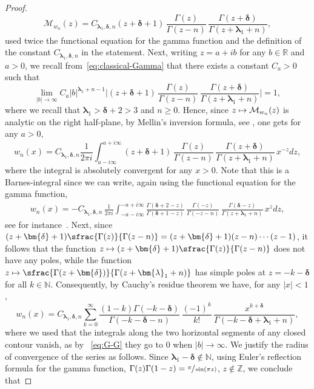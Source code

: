 \documentclass[JEP,XML,SOM,Unicode]{cedram}
\newcommand\mto{\mathchoice{\longmapsto}{\mapsto}{\mapsto}{\mapsto}}
\theoremstyle{plain}
\theoremstyle{definition}
\newcommand{\N}{\mathbb{N}}
\newcommand{\R}{\mathbb{R}}
\newcommand{\lam}{{\bm{\lambda}_1}}
\newcommand{\mm}{{\bm{\delta}}}
\begin{document}
\begin{proof}
\begin{equation*}
\mathcal{M}_{w_n}(z) = C_{\lam, \mm, n} (z+\mm+1)\,\frac{\Gamma(z)}{\Gamma(z-n)}\, \frac{\Gamma(z+\mm)}{\Gamma(z+\lam+n)},
\end{equation*}
used twice the functional equation for the gamma function and the definition of the constant $C_{\lam, \mm, n}$ in the statement. Next, writing $z=a+ib$ for any $b \in \R$ and $a>0$, we recall from~\eqref{eq:classical-Gamma} that there exists a constant $C_a > 0$ such that
\begin{equation}
\label{eq:G-G}
\lim_{|b| \to \infty} C_a |b|^{\lam + n-1} \biggl|(z+\mm+1)\, \frac{\Gamma(z)}{\Gamma(z-n)}\, \frac{\Gamma(z+\mm)}{\Gamma(z+\lam+n)} \biggl| = 1,
\end{equation}
where we recall that $\lam > \mm+2 >3$ and $n \geq 0$. Hence, since $z \mto \mathcal{M}_{w_n}(z)$ is analytic on the right half-plane, by Mellin's inversion formula, see \eg \cite[Chap.\,11]{Misra-Lavoine}, one gets for any $a>0$,
\begin{equation*}
w_n(x) = C_{\lam, \mm, n} \frac{1}{2 \pi i} \int_{a - i \infty}^{a + i \infty} (z+\mm+1)\,\frac{\Gamma(z)}{\Gamma(z-n)}\, \frac{\Gamma(z+\mm)}{\Gamma(z+\lam+n)}\, x^{-z} dz,
\end{equation*}
where the integral is absolutely convergent for any $x>0$. Note that this is a Barnes-integral since we can write, again using the functional equation for the gamma function,
\begin{align*}
w_n(x) = -C_{\lam, \mm, n}\,\frac{1}{2 \pi i} \int_{-a - i \infty}^{-a + i \infty} \frac{\Gamma(\mm+2-z)}{\Gamma(\mm+1-z)}\, \frac{\Gamma(-z)}{\Gamma(-z-n)}\, \frac{\Gamma(\mm-z)}{\Gamma(z+\lam+n)}\, x^{z}dz,
\end{align*}
see for instance~\cite{barnes_integrals}. Next, since $(z+\mm+1)\sfrac{\Gamma(z)}{\Gamma(z-n)} = (z+\mm+1)(z-n)\cdots(z-1)$, it follows that the function $z \mto (z+\mm+1)\sfrac{\Gamma(z)}{\Gamma(z-n)}$ does not have any poles, while the function $z \mto \sfrac{\Gamma(z+\mm)}{\Gamma(z+\lam+n)}$ has simple poles at $z = -k-\mm$ for all $k \in \N$. Consequently, by Cauchy's residue theorem we have, for any $|x|<1$,
\begin{equation*}
w_n(x) = C_{\lam, \mm, n} \sum_{k = 0}^{\infty} \frac{(1-k)\Gamma(-k-\mm)}{\Gamma(-k-\mm-n)}\, \frac{(-1)^k}{k!}\,\frac{x^{k+\mm}}{ \Gamma(-k-\mm+\lam+n)},
\end{equation*}
where we used that the integrals along the two horizontal segments of any closed contour vanish, as by ~\eqref{eq:G-G} they go to $0$ when $|b|\to \infty$. We justify the radius of convergence of the series as follows. Since $\lam - \mm \not\in \N$, using Euler's reflection formula for the gamma function, \ie $\Gamma(z)\Gamma(1-z) = \sfrac{\pi}{\sin(\pi z)}$, $z \not\in \mathbb{Z}$, we conclude that

\end{proof}
\end{document}
